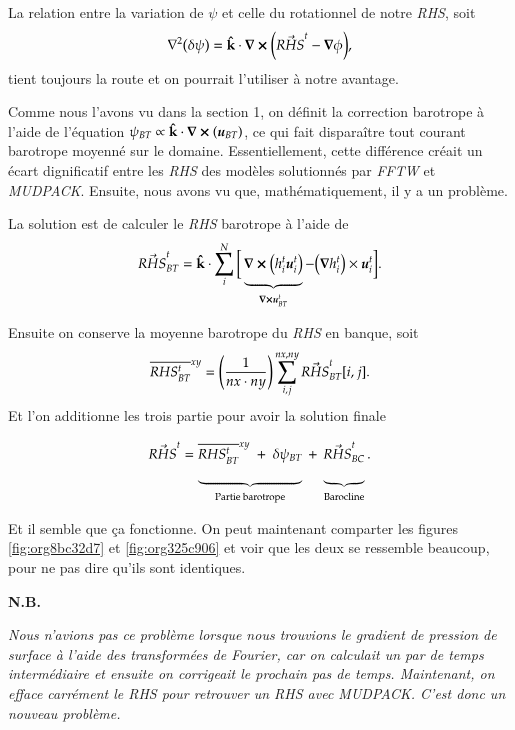 \documentclass[10pt]{article}
\numberwithin{equation}{section}
\newcommand{\kvf}{\vb{\hat{k}}}
\newcommand{\uu}{\vb*{u}}
\newcommand{\grande}{\vphantom{\frac{1}{xx}}}
\newcommand{\venti}{\vphantom{\sum_x^x}}
\newcommand{\xymean}[1]{\overline{#1}^{xy}}
\newcommand{\nb}{\textbf{N.B.}\hspace{4pt}}
\begin{document}
La relation entre la variation de \(\psi\) et celle du rotationnel de notre \emph{RHS}, soit
\begin{equation}
   \laplacian(\delta \psi) = \kvf\cdot\curl(\vec{RHS}^t - \gradient{\phi}),
\end{equation}
tient toujours la route et on pourrait l'utiliser à notre avantage.\bigskip

Comme nous l'avons vu dans la section 1, on définit la correction barotrope à l'aide de l'équation \(\psi_{BT} \propto \kvf\cdot\curl(\uu_{BT})\), ce qui fait disparaître tout courant barotrope moyenné sur le domaine.
Essentiellement, cette différence créait un écart dignificatif entre les \emph{RHS} des modèles solutionnés par \emph{FFTW} et \emph{MUDPACK}.
Ensuite, nous avons vu que, mathématiquement, il y a un problème.\bigskip

La solution est de calculer le \emph{RHS} barotrope à l'aide de
\begin{equation}
   \vec{RHS}^t_{BT} = \kvf\cdot \sum_i^N \bigg[ \underbrace{\grande\curl(h^t_i \uu^t_i)}_{\curl{\uu^t_{BT}}}  - \qty(\gradient{h^t_i})\times\uu^t_i\bigg].
\end{equation}

Ensuite on conserve la moyenne barotrope du \emph{RHS} en banque, soit
\begin{equation}
   \xymean{RHS^t_{BT}} = \qty(\frac{1}{nx\cdot ny})\sum_{i,j}^{nx,ny} \vec{RHS}^t_{BT}[i,j].
\end{equation}
Et l'on additionne les trois partie pour avoir la solution finale
\begin{equation}
   \vec{RHS}^t = \underbrace{\venti\xymean{RHS^t_{BT}} \ + \ \delta \psi_{BT}}_\text{Partie barotrope}\ + \ \underbrace{\venti\vec{RHS}^t_{BC}}_\text{Barocline}.
\end{equation}

Et il semble que ça fonctionne.
On peut maintenant comparter les figures \ref{fig:org8bc32d7} et \ref{fig:org325c906} et voir que les deux se ressemble beaucoup, pour ne pas dire qu'ils sont identiques. \bigskip

\nb\begin{minipage}[t]{0.9\linewidth}
\itshape Nous n'avions pas ce problème lorsque nous trouvions le gradient de pression de surface à l'aide des transformées de Fourier, car on calculait un par de temps intermédiaire et ensuite on corrigeait le prochain pas de temps. Maintenant, on efface carrément le RHS pour retrouver un RHS avec MUDPACK. C'est donc un nouveau problème.
\end{minipage}
\end{document}
